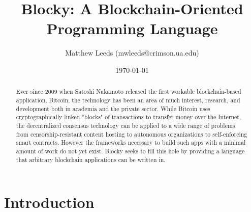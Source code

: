 \documentclass[letterpaper]{article}
\title{Blocky: A Blockchain-Oriented Programming Language}
\author{Matthew Leeds (mwleeds@crimson.ua.edu)}
\date{\today}
\begin{document}
\maketitle

\begin{abstract}
Ever since 2009 when Satoshi Nakamoto released the first workable blockchain-based application, Bitcoin, the technology has been an area of much interest, research, and development both in academia and the private sector. While Bitcoin uses cryptographically linked "blocks" of transactions to transfer money over the Internet, the decentralized consensus technology can be applied to a wide range of problems from censorship-resistant content hosting to autonomous organizations to self-enforcing smart contracts. However the frameworks necessary to build such apps with a minimal amount of work do not yet exist. Blocky seeks to fill this hole by providing a language that arbitrary blockchain applications can be written in.
\end{abstract}

\section{Introduction}
\end{document}
